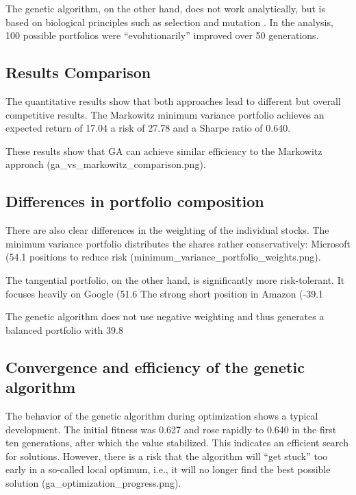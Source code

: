 \documentclass{agasthesis}
\begin{document}
The genetic algorithm, on the other hand, does not work analytically, but is based on biological principles such as selection and mutation \cite[p. 8-9]{melanie_introduction_1999}. 
In the analysis, 100 possible portfolios were “evolutionarily” improved over 50 generations.

\subsection{Results Comparison}
The quantitative results show that both approaches lead to different but overall competitive results. The Markowitz minimum variance portfolio achieves an expected return 
of 17.04%
a risk of 27.78%
and a Sharpe ratio of 0.640.

These results show that GA can achieve similar efficiency to the Markowitz approach (ga_vs_markowitz_comparison.png).

\subsection{Differences in portfolio composition}
There are also clear differences in the weighting of the individual stocks. The minimum variance portfolio distributes the shares rather conservatively: 
Microsoft (54.1%
positions to reduce risk (minimum_variance_portfolio_weights.png).

The tangential portfolio, on the other hand, is significantly more risk-tolerant. It focuses heavily on Google (51.6%
The strong short position in Amazon (-39.1%

The genetic algorithm does not use negative weighting and thus generates a balanced portfolio with 39.8%
\subsection{Convergence and efficiency of the genetic algorithm}
The behavior of the genetic algorithm during optimization shows a typical development. The initial fitness was 0.627 and rose rapidly to 0.640 in the first ten generations, 
after which the value stabilized. This indicates an efficient search for solutions. However, there is a risk that the algorithm will “get stuck” too early in a so-called local optimum, 
i.e., it will no longer find the best possible solution (ga_optimization_progress.png).
\end{document}
